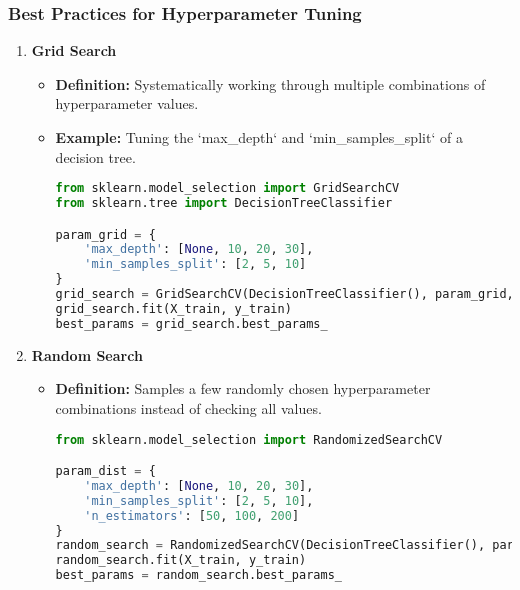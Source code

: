 \documentclass[aspectratio=169]{beamer}
\begin{document}
\begin{frame}[fragile]
    \frametitle{Best Practices for Hyperparameter Tuning}
    \begin{enumerate}
        \item \textbf{Grid Search}
        \begin{itemize}
            \item \textbf{Definition:} Systematically working through multiple combinations of hyperparameter values.
            \item \textbf{Example:} Tuning the `max_depth` and `min_samples_split` of a decision tree.
            \begin{lstlisting}[language=Python]
from sklearn.model_selection import GridSearchCV
from sklearn.tree import DecisionTreeClassifier

param_grid = {
    'max_depth': [None, 10, 20, 30],
    'min_samples_split': [2, 5, 10]
}
grid_search = GridSearchCV(DecisionTreeClassifier(), param_grid, cv=5)
grid_search.fit(X_train, y_train)
best_params = grid_search.best_params_
            \end{lstlisting}
        \end{itemize}
        
        \item \textbf{Random Search}
        \begin{itemize}
            \item \textbf{Definition:} Samples a few randomly chosen hyperparameter combinations instead of checking all values.
            \begin{lstlisting}[language=Python]
from sklearn.model_selection import RandomizedSearchCV

param_dist = {
    'max_depth': [None, 10, 20, 30],
    'min_samples_split': [2, 5, 10],
    'n_estimators': [50, 100, 200]
}
random_search = RandomizedSearchCV(DecisionTreeClassifier(), param_dist, n_iter=10, cv=5)
random_search.fit(X_train, y_train)
best_params = random_search.best_params_
            \end{lstlisting}
        \end{itemize}
    \end{enumerate}
\end{frame}
\end{document}
